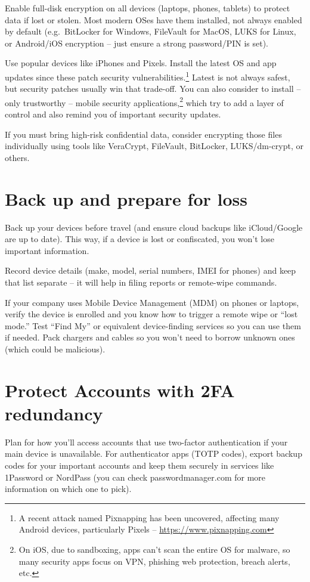 Enable full-disk encryption on all devices (laptops,
phones, tablets) to protect data if lost or stolen. Most
modern OSes have them installed, not always enabled by
default (e.g.\ BitLocker for Windows, FileVault for
MacOS, LUKS for Linux, or Android/iOS encryption -- just
ensure a strong password/PIN is set).

Use popular devices like iPhones and Pixels. Install the
latest OS and app updates since these patch security
vulnerabilities.\footnote{A recent attack named Pixnapping
has been uncovered, affecting many Android devices,
particularly Pixels -- \url{https://www.pixnapping.com}}
Latest is not always safest, but security patches usually
win that trade-off. You can also consider to install --
only trustworthy -- mobile security
applications,\footnote{On iOS, due to sandboxing, apps
can't scan the entire OS for malware, so many security
apps focus on VPN, phishing web protection, breach
alerts, etc.} which try to add a layer of control and also
remind you of important security updates.

If you must bring high-risk confidential data, consider
encrypting those files individually using tools like
VeraCrypt, FileVault, BitLocker, LUKS/dm-crypt, or others.

\section{Back up and prepare for loss}

Back up your devices before travel (and ensure cloud
backups like iCloud/Google are up to date). This way, if a
device is lost or confiscated, you won't lose important
information.

Record device details (make, model, serial numbers, IMEI
for phones) and keep that list separate -- it will help in
filing reports or remote-wipe commands.

If your company uses Mobile Device Management (MDM) on
phones or laptops, verify the device is enrolled and you
know how to trigger a remote wipe or ``lost mode.'' Test
``Find My'' or equivalent device-finding services so you
can use them if needed. Pack chargers and cables so you
won't need to borrow unknown ones (which could be
malicious).

\section{Protect Accounts with 2FA redundancy}

Plan for how you'll access accounts that use two-factor
authentication if your main device is unavailable. For
authenticator apps (TOTP codes), export backup codes for
your important accounts and keep them securely in services
like 1Password or NordPass (you can check
passwordmanager.com for more information on which one to
pick).

